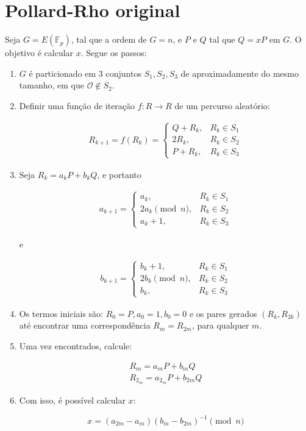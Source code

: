 \section{Pollard-Rho original}
Seja $G = E(\mathbb{F}_p)$, tal que a ordem de $G = n$, e \(P\) e \(Q\) tal que $Q = xP$ em \(G\). O objetivo é calcular \(x\). Segue os passos:

\begin{enumerate}
\item \(G\) é particionado em 3 conjuntos $S_1, S_2, S_3$ de aproximadamente do mesmo tamanho, em que $\mathcal{O} \notin S_2$.
\item Definir uma função de iteração $f : R \to R$ de um percurso aleatório:

\begin{eqnarray} \label{eq:walk}
R_{k+1} = f(R_k) =
\begin{cases}
Q + R_k, &R_k \in S_1 \\
2R_k, &R_k \in S_2 \\
P + R_k, &R_k \in S_3
\end{cases}
\end{eqnarray}

\item Seja $R_k = a_kP + b_kQ$, e portanto

\begin{eqnarray}
a_{k+1} =
\begin{cases}
a_k, &R_k \in S_1 \\
2a_k \pmod n, &R_k \in S_2 \\
a_k + 1, &R_k \in S_3
\end{cases}
\end{eqnarray}

e

\begin{eqnarray}
b_{k+1} =
\begin{cases}
b_k + 1, &R_k \in S_1 \\
2b_k \pmod n, &R_k \in S_2 \\
b_k, &R_k \in S_3
\end{cases}
\end{eqnarray}

\item Os termos iniciais são: $R_0 = P, a_0 = 1, b_0 = 0$ e os pares gerados $(R_k, R_{2k})$ até encontrar uma correspondência $R_m = R_{2m}$, para qualquer \(m\).

\item Uma vez encontrados, calcule:

\begin{eqnarray*}
R_m = a_mP + b_mQ \\
R_{2_m} = a_{2_m}P + b_{2m}Q
\end{eqnarray*}

\item Com isso, é possível calcular \(x\):

\begin{equation} \label{eq:x}
x = (a_{2m} - a_m)(b_m - b_{2m})^{-1} \pmod n
\end{equation}

\end{enumerate}

